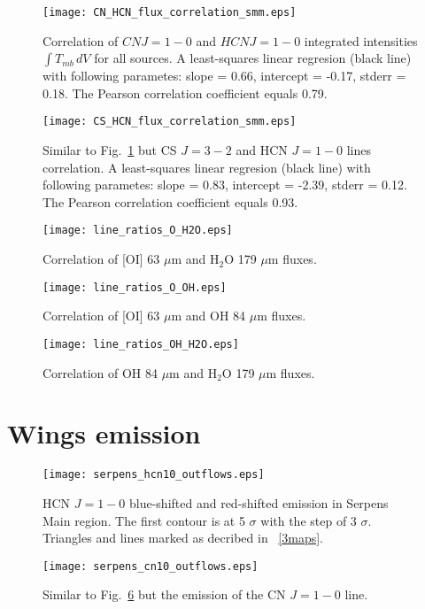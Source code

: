 \documentclass{aa}
\begin{document}
\begin{appendix}
\begin{figure}
\texttt{[image: CN\_HCN\_flux\_correlation\_smm.eps]}
\caption{Correlation of $CN J=1-0$ and $HCN J=1-0$ integrated intensities $\int{T_{mb} \, dV}$ for all sources. A least-squares linear regresion (black line) with following parametes: slope = 0.66, intercept = -0.17, stderr = 0.18. The Pearson correlation coefficient equals 0.79. }
\label{CN_HCN_corr_smm}
\end{figure}

\begin{figure}
\texttt{[image: CS\_HCN\_flux\_correlation\_smm.eps]}
\caption{Similar to Fig.~\ref{CN_HCN_corr_smm} but CS $J=3-2$ and HCN $J=1-0$ lines correlation. A least-squares linear regresion (black line) with following parametes: slope = 0.83, intercept = -2.39, stderr = 0.12. The Pearson correlation coefficient equals 0.93. }
\label{CS_HCN_corr_smm}
\end{figure}

\begin{figure}
\texttt{[image: line\_ratios\_O\_H2O.eps]}
\caption{Correlation of [OI] 63 $\mu$m and H$_2$O 179 $\mu$m fluxes.}
\label{h13cn10}
\end{figure}

\begin{figure}
\texttt{[image: line\_ratios\_O\_OH.eps]}
\caption{Correlation of [OI] 63 $\mu$m and OH 84 $\mu$m fluxes.}
\label{h13cn10}
\end{figure}

\begin{figure}
\texttt{[image: line\_ratios\_OH\_H2O.eps]}
\caption{Correlation of OH 84 $\mu$m and H$_2$O 179 $\mu$m fluxes.}
\label{h13cn10}
\end{figure}

\section{Wings emission}

\begin{figure}
\texttt{[image: serpens\_hcn10\_outflows.eps]}
\caption{HCN $J=1-0$ blue-shifted and red-shifted emission in Serpens Main region. The first contour is at 5 $\sigma$ with the step of 3 $\sigma$. Triangles and lines marked as decribed in ~\ref{3maps}.}
\label{hcn10_blue_red}
\end{figure}

\begin{figure}
\texttt{[image: serpens\_cn10\_outflows.eps]}
\caption{Similar to Fig.~\ref{hcn10_blue_red} but the emission of the CN $J=1-0$ line.}
\label{cn10_blue_red}
\end{figure}


\end{appendix}
\end{document}
